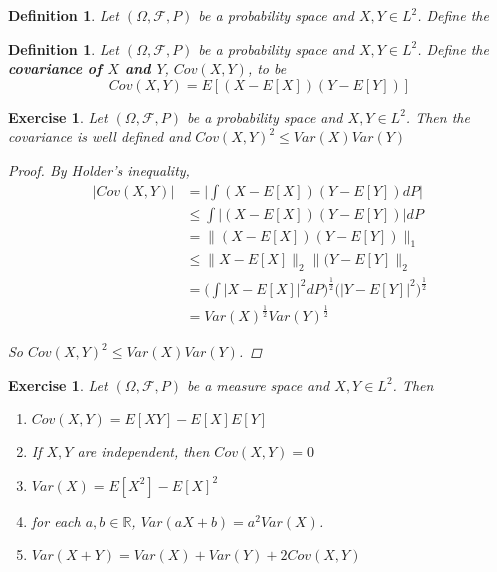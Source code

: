 \documentclass[12pt]{amsart}
\newtheorem{defn}[thm]{Definition}
\newtheorem{ex}[thm]{Exercise}
\newcommand{\Om}{\Omega}
\newcommand{\R}{\mathbb{R}}
\newcommand{\MF}{\mathcal{F}}
\begin{document}
	\begin{defn}
		Let $(\Om, \MF, P)$ be a probability space and $X,Y \in L^2$. Define the  
	\end{defn}
	
	
	\begin{defn}
		Let $(\Om, \MF, P)$ be a probability space and $X,Y \in L^2$. Define the \textbf{covariance of $X$ and $Y$}, $Cov(X,Y)$, to be $$Cov(X,Y) = E[(X-E[X])(Y-E[Y])]$$
	\end{defn}
	
	\begin{ex}
		Let $(\Om, \MF, P)$ be a probability space and $X,Y \in L^2$. Then the covariance is well defined and $Cov(X,Y) ^2 \leq Var(X)Var(Y)$
		
		\begin{proof}
			By Holder's inequality, 
			\begin{align*}
				\vert Cov(X,Y) \vert 
				&= \bigg \vert \int (X-E[X])(Y-E[Y]) dP \bigg \vert \\
				&\leq \int \vert (X-E[X])(Y-E[Y]) \vert dP \\
				&= \|(X-E[X])(Y-E[Y]) \|_1 \\
				&\leq \|X-E[X] \|_2 \|(Y-E[Y] \|_2  \\
				&= \bigg(\int \vert X - E[X] \vert^2 dP\bigg)^{\frac{1}{2}} \bigg( \vert Y - E[Y] \vert^2 \bigg)^{\frac{1}{2}} \\
				&= Var(X)^{\frac{1}{2}}Var(Y)^{\frac{1}{2}}
			\end{align*}
			
			So $Cov(X,Y) ^2 \leq Var(X)Var(Y)$.
		\end{proof}
		
	\end{ex}
	
	\begin{ex}
		Let $(\Om, \MF, P)$ be a measure space and $X,Y \in L^2$. Then
		\begin{enumerate}
			\item $Cov(X,Y) = E[XY]-E[X]E[Y]$
			\item If $X,Y$ are independent, then $Cov(X,Y) = 0$
			\item $Var(X) = E[X^2] - E[X]^2$
			\item for each $a,b \in \R$, $Var(aX + b) = a^2Var(X)$.
			\item $Var(X+Y) = Var(X) + Var(Y) + 2 Cov(X,Y)$
		\end{enumerate}
	\end{ex}
	
\end{document}
